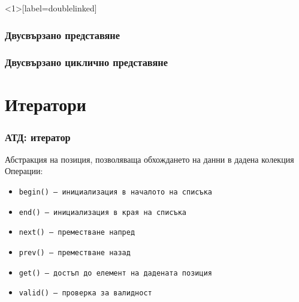 \documentclass[alsotrans]{beamerswitch}
\newcommand{\doublelinkedchain}{
  \triplecell{a1}{a_1}
  \nexttriplecell{a2}{a_2}{a1}
  \triplenextdots{a2}
  \dotsnexttriplecell{an}{a_n}
}
\begin{document}
\begin{frame}<1>[label=doublelinked]
  \frametitle{Двусвързано представяне}

  \begin{center}
  \end{center}
\end{frame}

\begin{frame}
  \frametitle{Двусвързано циклично представяне}

  \begin{center}
  \end{center}
\end{frame}

\section{Итератори}

\begin{frame}
  \frametitle{АТД: итератор}

  Абстракция на позиция, позволяваща обхождането на данни в дадена колекция\\[2ex]
  Операции:\\[1ex]
  \begin{itemize}
  \item \tt{begin()} -- инициализация в началото на списъка
  \item \tt{end()} -- инициализация в края на списъка
  \item \tt{next()} -- преместване напред
  \item \tt{prev()} -- преместване назад
  \item \tt{get()} -- достъп до елемент на дадената позиция
  \item \tt{valid()} -- проверка за валидност
  \end{itemize}
\end{frame}
\end{document}
